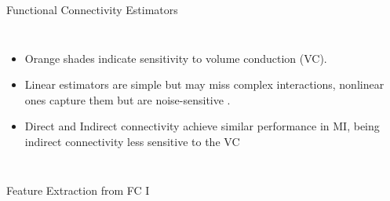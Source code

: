 \documentclass[aspectratio=169]{beamer}
\let\oldcite\cite %
\renewcommand{\cite}[1]{{\tiny\oldcite{#1}}}
\begin{document}
\begin{frame}{Functional Connectivity Estimators}
    \begin{columns}
        \centering
        \begin{itemize}
            \item Orange shades indicate sensitivity to volume conduction (VC).
            \item Linear estimators are simple but may miss complex interactions, nonlinear ones capture them but are noise-sensitive \cite{gonzalez2020network}.
            \item Direct and Indirect connectivity achieve similar performance in MI, being indirect connectivity less sensitive to the VC~\cite{cao2022effective}
        \end{itemize}
    \end{columns}       
\end{frame}


\begin{frame}{Feature Extraction from FC I}
    \centering
\end{frame}
\end{document}
